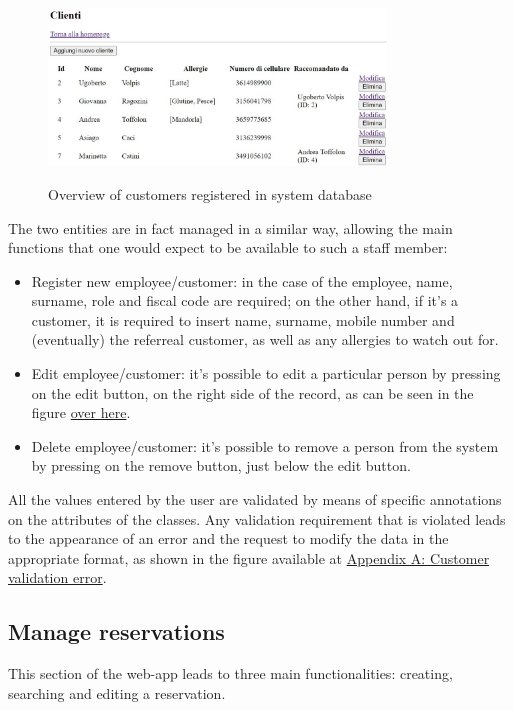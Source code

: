 \documentclass{article}
\begin{document}
\begin{figure}[H]
    \centering
    \includegraphics[width=0.8\textwidth]{images/customers_overview.jpg}
    \label{fig:customers_overview}
    \caption{Overview of customers registered in system database}
\end{figure}

The two entities are in fact managed in a similar way, allowing the main functions that one would expect to be available to such a staff member:

\begin{itemize}
  \item Register new employee/customer: in the case of the employee, name, surname, role and fiscal code are required; on the other hand, if it's a customer, it is required to insert name, surname, mobile number and (eventually) the referreal customer, as well as any allergies to watch out for.
  \item Edit employee/customer: it's possible 
  to edit a particular person by pressing on the edit button, on the right side of the record, as can be seen in the figure \hyperref[fig:customers_overview]{over here}.
  \item Delete employee/customer: it's possible 
  to remove a person from the system by pressing on the remove button, just below the edit button.
\end{itemize}

All the values entered by the user are validated by means of specific annotations on the attributes of the classes. Any validation requirement that is violated leads to the appearance of an error and the request to modify the data in the appropriate format, as shown in the figure available at \hyperref[fig:customer_validation_error]{Appendix A: Customer validation error}.

\subsection*{Manage reservations}
This section of the web-app leads to three main functionalities: creating, searching
and editing a reservation.
\end{document}
